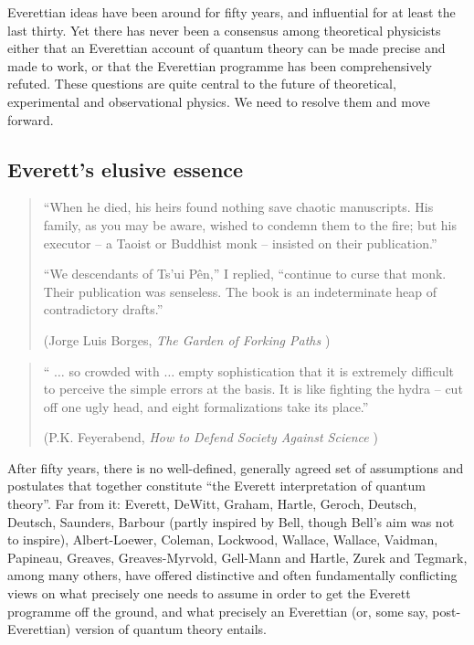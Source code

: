 \documentclass[aps,
pra,epsfig]{revtex4}
\begin{document}
Everettian ideas have been around for fifty years, and influential for
at least the last thirty.  Yet there has never been a consensus among
theoretical physicists either that an Everettian account of quantum
theory can be made precise and made to work, or that the Everettian
programme has been comprehensively refuted.  These questions are quite
central to the future of theoretical, experimental and observational
physics.  We need to resolve them and move forward.

\subsection{Everett's elusive essence}

\begin{quotation}
``When he died, his heirs found nothing save chaotic manuscripts. His
family, as you may be aware, wished to condemn them to the fire; but 
his executor -- a Taoist or Buddhist monk --  insisted on their
publication.''

``We descendants of Ts'ui P\^{e}n,'' I  replied, ``continue to curse that
monk. Their publication was senseless. The book is an indeterminate
heap of contradictory drafts.''

(Jorge Luis Borges, {\it The Garden of Forking Paths} \cite{borges}) 
\end{quotation}

\begin{quotation}
`` $\ldots$ so crowded with $\ldots$ empty
sophistication that it is extremely difficult to
perceive the simple errors at the basis. It is like fighting the hydra --
cut off one ugly head, and eight formalizations take its place.'' 

(P.K. Feyerabend, {\it  How to Defend Society Against 
Science} \cite{feyerabend})
\end{quotation}

After fifty years, there is no well-defined, generally agreed set of
assumptions and postulates that together constitute ``the Everett
interpretation of quantum theory''.  Far from it: Everett\cite{everettone,everetttwo}, 
DeWitt\cite{dewitt}, Graham\cite{graham}, Hartle\cite{hartlefreq}, Geroch\cite{geroch}, 
Deutsch\cite{deutschone}, Deutsch\cite{deutschtwo}, 
Saunders\cite{saundersvol}, Barbour\cite{barbour} (partly inspired
by Bell\cite{bellmw}, though Bell's aim was not to inspire), 
Albert-Loewer\cite{almanyminds}, Coleman\cite{coleman}, 
Lockwood\cite{lockwood}, Wallace\cite{wallacevolone}, 
Wallace\cite{wallacevoltwo}, Vaidman\cite{vaidman}, 
Papineau\cite{papineauvol}, Greaves\cite{greaves}, 
Greaves-Myrvold\cite{greavesmyrvoldvol},
Gell-Mann and Hartle\cite{hartlevol}, Zurek\cite{zurekvol} and
Tegmark\cite{tegmarkvol}, among many others, have offered
distinctive and often fundamentally conflicting views on what 
precisely one needs to assume in order to get the Everett programme off
the ground, and what precisely an Everettian (or, some say,
post-Everettian) version of quantum theory entails.  
\end{document}
